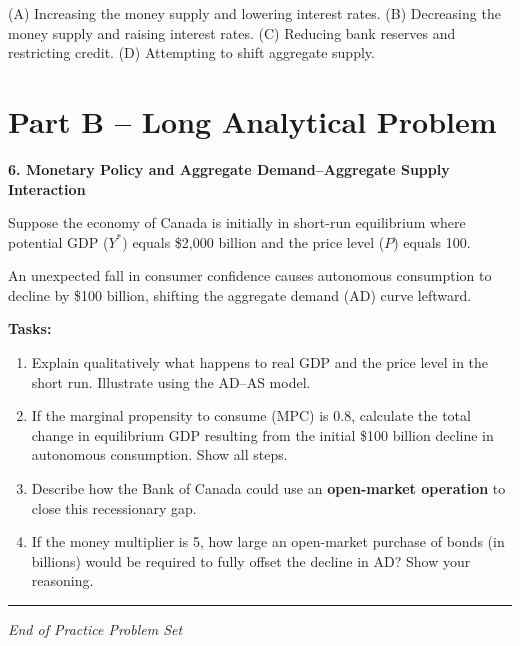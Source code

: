 \documentclass[12pt]{article}
\begin{document}
(A) Increasing the money supply and lowering interest rates.  
(B) Decreasing the money supply and raising interest rates.  
(C) Reducing bank reserves and restricting credit.  
(D) Attempting to shift aggregate supply.

\newpage

\section*{Part B – Long Analytical Problem}

\textbf{6. Monetary Policy and Aggregate Demand–Aggregate Supply Interaction}

Suppose the economy of Canada is initially in short-run equilibrium where potential GDP (\(Y^*\)) equals \$2{,}000 billion and the price level (\(P\)) equals 100.  

An unexpected fall in consumer confidence causes autonomous consumption to decline by \$100 billion, shifting the aggregate demand (AD) curve leftward.

\textbf{Tasks:}
\begin{enumerate}
    \item[(a)] Explain qualitatively what happens to real GDP and the price level in the short run. Illustrate using the AD–AS model.
    \item[(b)] If the marginal propensity to consume (MPC) is 0.8, calculate the total change in equilibrium GDP resulting from the initial \$100 billion decline in autonomous consumption. Show all steps.
    \item[(c)] Describe how the Bank of Canada could use an \textbf{open-market operation} to close this recessionary gap.
    \item[(d)] If the money multiplier is 5, how large an open-market purchase of bonds (in billions) would be required to fully offset the decline in AD? Show your reasoning.
\end{enumerate}

\vspace{1em}
\hrule
\vspace{1em}

\begin{center}
\textit{End of Practice Problem Set}
\end{center}
\end{document}
